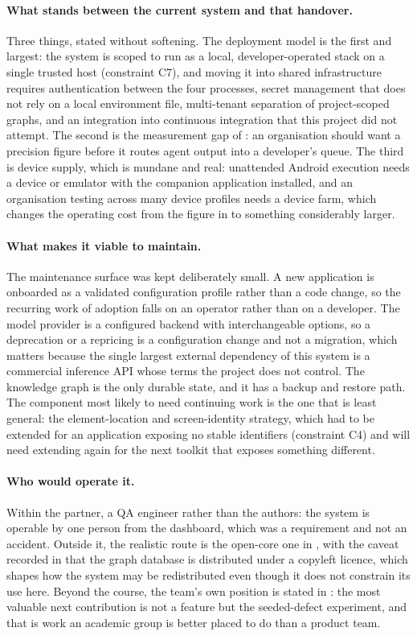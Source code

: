 \paragraph{What stands between the current system and that handover.} Three
things, stated without softening. The deployment model is the first and
largest: the system is scoped to run as a local, developer-operated stack on a
single trusted host (constraint C7), and moving it into shared infrastructure
requires authentication between the four processes, secret management that does
not rely on a local environment file, multi-tenant separation of project-scoped
graphs, and an integration into continuous integration that this project did
not attempt. The second is the measurement gap of : an
organisation should want a precision figure before it routes agent output into
a developer's queue. The third is device supply, which is mundane and real:
unattended Android execution needs a device or emulator with the companion
application installed, and an organisation testing across many device profiles
needs a device farm, which changes the operating cost from the figure in
 to something considerably larger.

\paragraph{What makes it viable to maintain.} The maintenance surface was kept
deliberately small. A new application is onboarded as a validated configuration
profile rather than a code change, so the recurring work of adoption falls on
an operator rather than on a developer. The model provider is a configured
backend with interchangeable options, so a deprecation or a repricing is a
configuration change and not a migration, which matters because the single
largest external dependency of this system is a commercial inference API whose
terms the project does not control. The knowledge graph is the only durable
state, and it has a backup and restore path. The component most likely to need
continuing work is the one that is least general: the element-location and
screen-identity strategy, which had to be extended for an application exposing
no stable identifiers (constraint C4) and will need extending again for the
next toolkit that exposes something different.

\paragraph{Who would operate it.} Within the partner, a QA engineer rather than
the authors: the system is operable by one person from the dashboard, which was
a requirement and not an accident. Outside it, the realistic route is the
open-core one in , with the caveat recorded in
 that the graph database is distributed under a copyleft licence,
which shapes how the system may be redistributed even though it does not
constrain its use here. Beyond the course, the team's own position is stated in
: the most valuable next contribution is not a feature but
the seeded-defect experiment, and that is work an academic group is better
placed to do than a product team.

